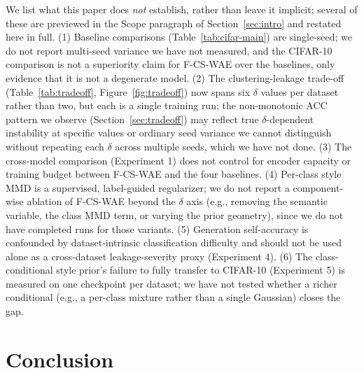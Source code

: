 \documentclass[10pt,letterpaper]{article}
\newcommand{\ours}{F-CS-WAE}
\begin{document}
We list what this paper does \emph{not} establish, rather than leave it
implicit; several of these are previewed in the Scope paragraph of
Section~\ref{sec:intro} and restated here in full. (1) Baseline comparisons
(Table~\ref{tab:cifar-main}) are single-seed; we do not report multi-seed
variance we have not measured, and the CIFAR-10 comparison is not a
superiority claim for \ours{} over the baselines, only evidence that it is
not a degenerate model. (2) The clustering-leakage trade-off
(Table~\ref{tab:tradeoff}, Figure~\ref{fig:tradeoff}) now spans six $\delta$
values per dataset rather than two, but each is a single training run; the
non-monotonic ACC pattern we observe (Section~\ref{sec:tradeoff}) may
reflect true $\delta$-dependent instability at specific values or ordinary
seed variance we cannot distinguish without repeating each $\delta$ across
multiple seeds, which we have not done. (3) The cross-model
comparison (Experiment 1) does not control for encoder capacity or training
budget between \ours{} and the four baselines. (4) Per-class style MMD is a
supervised, label-guided regularizer; we do not report a component-wise
ablation of \ours{} beyond the $\delta$ axis (e.g., removing the semantic
variable, the class MMD term, or varying the prior geometry), since we do
not have completed runs for those variants. (5) Generation self-accuracy is
confounded by dataset-intrinsic classification difficulty and should not be
used alone as a cross-dataset leakage-severity proxy (Experiment 4). (6)
The class-conditional style prior's failure to fully transfer to CIFAR-10
(Experiment 5) is measured on one checkpoint per dataset; we have not
tested whether a richer conditional (e.g., a per-class mixture rather than
a single Gaussian) closes the gap.

\section{Conclusion}
\end{document}
